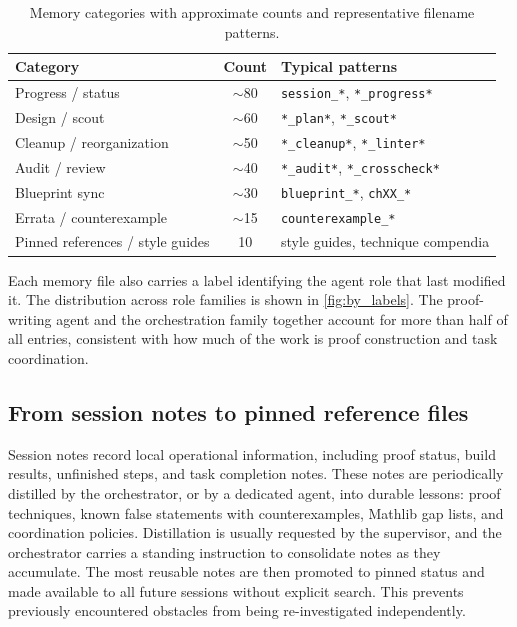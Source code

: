 \begin{table}[h]
    \caption{\label{tab:memory_types}Memory categories with approximate counts and representative filename patterns.}
    \begin{tabular}{lcl}
        \toprule
        {Category}                       & {Count}  & {Typical patterns}                          \\
        \midrule
        Progress / status                & $\sim$80 & \texttt{session\_*}, \texttt{*\_progress*}  \\
        Design / scout                   & $\sim$60 & \texttt{*\_plan*}, \texttt{*\_scout*}       \\
        Cleanup / reorganization         & $\sim$50 & \texttt{*\_cleanup*}, \texttt{*\_linter*}   \\
        Audit / review                   & $\sim$40 & \texttt{*\_audit*}, \texttt{*\_crosscheck*} \\
        Blueprint sync                   & $\sim$30 & \texttt{blueprint\_*}, \texttt{chXX\_*}     \\
        Errata / counterexample          & $\sim$15 & \texttt{counterexample\_*}                  \\
        Pinned references / style guides & 10       & style guides, technique compendia           \\
        \bottomrule
    \end{tabular}
\end{table}

Each memory file also carries a label identifying the agent role that last
modified it. The distribution across role families is shown in
\cref{fig:by_labels}. The proof-writing agent and the orchestration family
together account for more than half of all entries, consistent with how much of
the work is proof construction and task coordination.




\subsection{From session notes to pinned reference files}\label{sec:knowledge_lifecycle}

Session notes record local operational information, including proof status, build results, unfinished steps, and task completion notes. These notes are periodically distilled by the orchestrator, or by a dedicated agent, into durable lessons: proof techniques, known false statements with counterexamples, Mathlib gap lists, and coordination policies. Distillation is usually requested by the supervisor, and the orchestrator carries a standing instruction to consolidate notes as they accumulate. The most reusable notes are then promoted to pinned status and made available to all future sessions without explicit search. This prevents previously encountered obstacles from being re-investigated independently.

